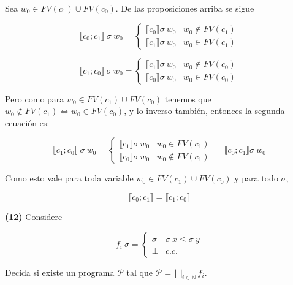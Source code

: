 \documentclass[article, 12pt]{article}
\begin{document}
Sea $w_0 \in FV(c_1) \cup FV(c_0)$. De las proposiciones arriba se sigue

\begin{equation*}
  \llbracket c_0;c_1 \rrbracket ~ \sigma ~ w_0 = \begin{cases}
    \llbracket c_0 \rrbracket\sigma ~ w_0 & w_0 \not\in FV(c_1) \\ 
    \llbracket c_1 \rrbracket \sigma ~ w_0 & w_0 \in FV(c_1)
  \end{cases}
\end{equation*}

\begin{equation*}
  \llbracket c_1;c_0 \rrbracket ~ \sigma ~ w_0 = \begin{cases}
    \llbracket c_1 \rrbracket\sigma ~ w_0 & w_0 \not\in FV(c_0) \\ 
    \llbracket c_0 \rrbracket \sigma ~ w_0 & w_0 \in FV(c_0)
  \end{cases}
\end{equation*}

Pero como para $w_0 \in FV(c_1) \cup FV(c_0)$ tenemos que 
$w_0 \not\in FV(c_1) \iff w_0 \in FV(c_0)$, y lo inverso también, entonces
la segunda ecuación es:


\begin{equation*}
  \llbracket c_1;c_0 \rrbracket ~ \sigma ~ w_0 = \begin{cases}
    \llbracket c_1 \rrbracket\sigma ~ w_0 & w_0 \in FV(c_1) \\ 
    \llbracket c_0 \rrbracket \sigma ~ w_0 & w_0 \not\in FV(c_1)
  \end{cases} = \llbracket c_0;c_1 \rrbracket \sigma ~ w_0
\end{equation*}

Como esto vale para toda variable $w_0 \in FV(c_1) \cup FV(c_0)$ y para
todo $\sigma$, 

\begin{equation*}
  \llbracket c_0;c_1 \rrbracket = \llbracket c_1;c_0 \rrbracket
\end{equation*}

\pagebreak 

\begin{myframe}
  \textbf{(12)} Considere 

  \begin{equation*}
    f_i ~ \sigma = \begin{cases}
      \sigma & \sigma ~ x \leq \sigma ~ y \\ 
      \bot  & c.c.
    \end{cases}
  \end{equation*}

  Decida si existe un programa $\mathcal{P}$ tal que $\mathcal{P} = \bigsqcup_{i
  \in \mathbb{N}} f_i$.
\end{myframe}
\end{document}
